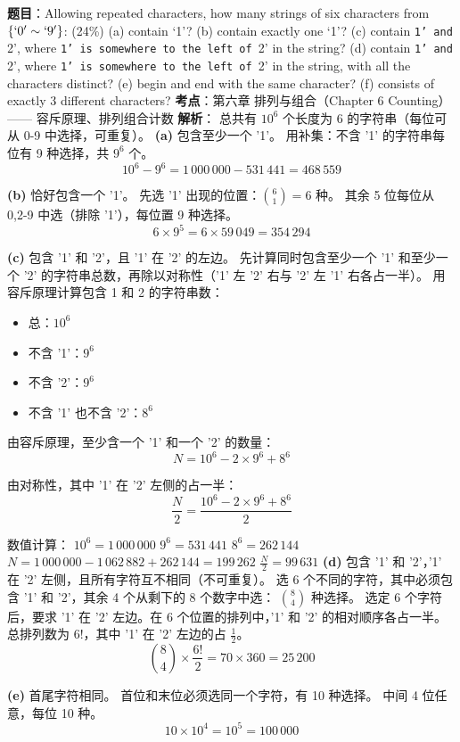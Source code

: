 \documentclass[10pt,a4paper,openany]{ctexbook}
\theoremstyle{definition}
\theoremstyle{remark}
\begin{document}
\textbf{题目}：Allowing repeated characters, how many strings of six characters from $\{`0' \sim `9'\}$: (24\%)
(a) contain `1'?
(b) contain exactly one `1'?
(c) contain \texttt{1' and }2', where \texttt{1' is somewhere to the left of }2' in the string?
(d) contain \texttt{1' and }2', where \texttt{1' is somewhere to the left of }2' in the string, with all the characters distinct?
(e) begin and end with the same character?
(f) consists of exactly 3 different characters?
\textbf{考点}：第六章 排列与组合（Chapter 6 Counting）—— 容斥原理、排列组合计数
\textbf{解析}：
总共有 $10^6$ 个长度为 6 的字符串（每位可从 0-9 中选择，可重复）。
\textbf{(a)} 包含至少一个 '1'。
用补集：不含 '1' 的字符串每位有 9 种选择，共 $9^6$ 个。
\[
10^6 - 9^6 = 1\,000\,000 - 531\,441 = 468\,559
\]

\textbf{(b)} 恰好包含一个 '1'。
先选 '1' 出现的位置：$\binom{6}{1} = 6$ 种。
其余 5 位每位从 0,2-9 中选（排除 '1'），每位置 9 种选择。
\[
6 \times 9^5 = 6 \times 59\,049 = 354\,294
\]

\textbf{(c)} 包含 '1' 和 '2'，且 '1' 在 '2' 的左边。
先计算同时包含至少一个 '1' 和至少一个 '2' 的字符串总数，再除以对称性（'1' 左 '2' 右与 '2' 左 '1' 右各占一半）。
用容斥原理计算包含 1 和 2 的字符串数：
\begin{itemize}
\item 总：$10^6$
\item 不含 '1'：$9^6$
\item 不含 '2'：$9^6$
\item 不含 '1' 也不含 '2'：$8^6$

\end{itemize}

由容斥原理，至少含一个 '1' 和一个 '2' 的数量：
\[
N = 10^6 - 2 \times 9^6 + 8^6
\]

由对称性，其中 '1' 在 '2' 左侧的占一半：
\[
\frac{N}{2} = \frac{10^6 - 2 \times 9^6 + 8^6}{2}
\]

数值计算：
$10^6 = 1\,000\,000$
$9^6 = 531\,441$
$8^6 = 262\,144$
$N = 1\,000\,000 - 1\,062\,882 + 262\,144 = 199\,262$
$\displaystyle \frac{N}{2} = 99\,631$
\textbf{(d)} 包含 '1' 和 '2'，'1' 在 '2' 左侧，且所有字符互不相同（不可重复）。
选 6 个不同的字符，其中必须包含 '1' 和 '2'，其余 4 个从剩下的 8 个数字中选：
$\binom{8}{4}$ 种选择。
选定 6 个字符后，要求 '1' 在 '2' 左边。在 6 个位置的排列中，'1' 和 '2' 的相对顺序各占一半。
总排列数为 $6!$，其中 '1' 在 '2' 左边的占 $\frac{1}{2}$。
\[
\binom{8}{4} \times \frac{6!}{2} = 70 \times 360 = 25\,200
\]

\textbf{(e)} 首尾字符相同。
首位和末位必须选同一个字符，有 10 种选择。
中间 4 位任意，每位 10 种。
\[
10 \times 10^4 = 10^5 = 100\,000
\]
\end{document}
